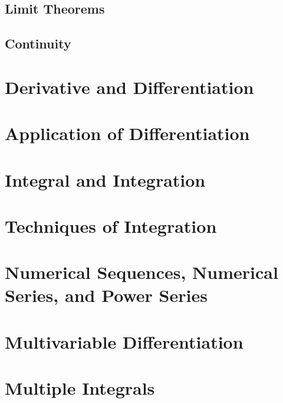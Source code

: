 \documentclass[11pt]{book}
\theoremstyle{break}
\theoremstyle{no_label}
\numberwithin{equation}{section}
\begin{document}
\section{Limit Theorems}



\section{Continuity}





\chapter{Derivative and Differentiation}



\chapter{Application of Differentiation}



\chapter{Integral and Integration}



\chapter{Techniques of Integration}



\chapter{Numerical Sequences, Numerical Series, and Power Series}



\chapter{Multivariable Differentiation}



\chapter{Multiple Integrals}
\end{document}

